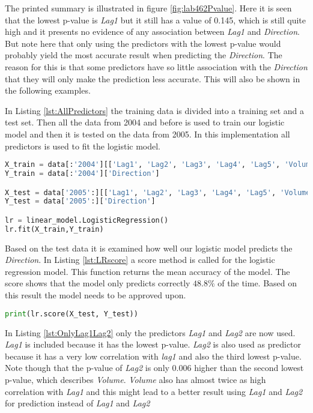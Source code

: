 The printed summary is illustrated in figure \ref{fig:lab462Pvalue}. Here it is  seen that the lowest p-value is \emph{Lag1} but it still has a value of 0.145, which is still quite high and it presents no evidence of any association between \emph{Lag1} and \emph{Direction}. But note here that only using the predictors with the lowest p-value would probably yield the most accurate result when predicting the \emph{Direction}. The reason for this is that some predictors have so little association with the \emph{Direction} that they will only make the prediction less accurate. This will also be shown in the following examples.


In Listing \ref{lst:AllPredictors} the training data is divided into a training set and a test set. Then all the data from 2004 and before is used to train our logistic model and then it is tested on the data from 2005. In this implementation all predictors is used to fit the logistic model.

\begin{lstlisting}[language=Python, label=lst:AllPredictors, caption=Logistic regression using all predictors]
X_train = data[:'2004'][['Lag1', 'Lag2', 'Lag3', 'Lag4', 'Lag5', 'Volume']]
Y_train = data[:'2004']['Direction']

X_test = data['2005':][['Lag1', 'Lag2', 'Lag3', 'Lag4', 'Lag5', 'Volume']]
Y_test = data['2005':]['Direction']

lr = linear_model.LogisticRegression()
lr.fit(X_train,Y_train)
\end{lstlisting}

Based on the test data it is examined how well our logistic model predicts the \emph{Direction}. In Listing \ref{lst:LRscore} a score method is called for the logistic regression model. This function returns the mean accuracy of the model. The score shows that the model only predicts correctly $48.8\%$ of the time. Based on this result the model needs to be approved upon.
\begin{lstlisting}[language=Python, label=lst:LRscore, caption=Print mean accuracy]
print(lr.score(X_test, Y_test))
\end{lstlisting}

In Listing \ref{lst:OnlyLag1Lag2} only the predictors \emph{Lag1} and \emph{Lag2} are now used. \emph{Lag1} is included because it has the lowest p-value. \emph{Lag2} is also used as predictor because it has a very low correlation with \emph{lag1} and also the third lowest p-value.
Note though that the p-value of \emph{Lag2} is only 0.006 higher than the second lowest p-value, which describes \emph{Volume}. \emph{Volume} also has almost twice as high correlation with \emph{Lag1} and this might lead to a better result using \emph{Lag1} and \emph{Lag2} for prediction instead of \emph{Lag1} and \emph{Lag2}

